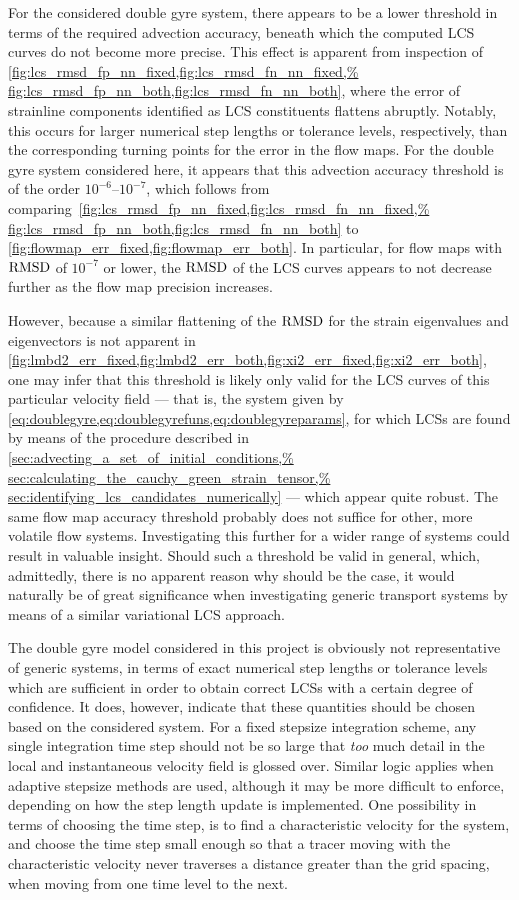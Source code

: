 For the considered double gyre system, there appears to be a lower threshold
in terms of the required advection accuracy, beneath which the computed LCS
curves do not become more precise. This effect is apparent
from inspection of
\cref{fig:lcs_rmsd_fp_nn_fixed,fig:lcs_rmsd_fn_nn_fixed,%
fig:lcs_rmsd_fp_nn_both,fig:lcs_rmsd_fn_nn_both}, where the error of strainline
components identified as LCS constituents flattens abruptly. Notably, this
occurs for larger numerical step lengths or tolerance levels, respectively,
than the corresponding turning points for the error in the flow maps.
For the double gyre system considered here, it appears that this advection
accuracy threshold is of the order $10^{-6}$--$10^{-7}$, which follows from
comparing~\cref{fig:lcs_rmsd_fp_nn_fixed,fig:lcs_rmsd_fn_nn_fixed,%
fig:lcs_rmsd_fp_nn_both,fig:lcs_rmsd_fn_nn_both} to
\cref{fig:flowmap_err_fixed,fig:flowmap_err_both}. In particular, for flow maps
with $\operatorname{RMSD}$ of $10^{-7}$ or lower, the $\operatorname{RMSD}$ of the LCS curves appears to
not decrease further as the flow map precision increases.

However, because a similar flattening of the $\operatorname{RMSD}$ for the strain eigenvalues
and eigenvectors is not apparent in
\cref{fig:lmbd2_err_fixed,fig:lmbd2_err_both,fig:xi2_err_fixed,fig:xi2_err_both},
one may infer that this threshold is likely only valid for the LCS curves
of this particular velocity field --- that is, the system given by
\cref{eq:doublegyre,eq:doublegyrefuns,eq:doublegyreparams}, for which LCSs are
found by means of the procedure described in
\cref{sec:advecting_a_set_of_initial_conditions,%
    sec:calculating_the_cauchy_green_strain_tensor,%
sec:identifying_lcs_candidates_numerically} --- which
appear quite robust. The same flow map accuracy threshold probably does not
suffice for other, more volatile flow systems. Investigating
this further for a wider range of systems could result in valuable insight.
Should such a threshold be valid in general, which, admittedly, there is
no apparent reason why should be the case, it would naturally be of great
significance when investigating generic transport systems by means of a
similar variational LCS approach.

The double gyre model considered in this project is obviously not representative
of generic systems, in terms of exact numerical step lengths or tolerance
levels which are sufficient in order to obtain correct LCSs with a certain
degree of confidence. It does, however, indicate that these quantities should
be chosen based on the considered system. For a fixed stepsize integration
scheme, any single integration time step should not be so large that \emph{too}
much detail in the local and instantaneous velocity field is glossed over.
Similar logic applies when adaptive stepsize methods are used, although it
may be more difficult to enforce, depending on how the step length
update is implemented. One possibility in terms of choosing the time step, is to
find a characteristic velocity for the system, and choose the time step small
enough so that a tracer moving with the characteristic velocity never traverses
a distance greater than the grid spacing, when moving from one time level to
the next.

